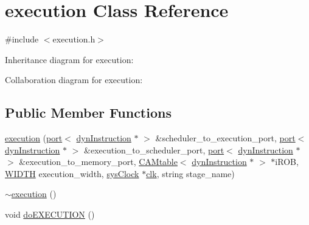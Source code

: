 \hypertarget{classexecution}{
\section{execution Class Reference}
\label{classexecution}
}


{\ttfamily \#include $<$execution.h$>$}



Inheritance diagram for execution:


Collaboration diagram for execution:
\subsection*{Public Member Functions}
\begin{DoxyCompactItemize}
\item 
\hyperlink{classexecution_a8f150cc5dfd7174f3bdfd168a083c0e7}{execution} (\hyperlink{classport}{port}$<$ \hyperlink{classdynInstruction}{dynInstruction} $\ast$ $>$ \&scheduler\_\-to\_\-execution\_\-port, \hyperlink{classport}{port}$<$ \hyperlink{classdynInstruction}{dynInstruction} $\ast$ $>$ \&execution\_\-to\_\-scheduler\_\-port, \hyperlink{classport}{port}$<$ \hyperlink{classdynInstruction}{dynInstruction} $\ast$ $>$ \&execution\_\-to\_\-memory\_\-port, \hyperlink{classCAMtable}{CAMtable}$<$ \hyperlink{classdynInstruction}{dynInstruction} $\ast$ $>$ $\ast$iROB, \hyperlink{global_2global_8h_a6fa2e24b8a418fa215e183264cbea3aa}{WIDTH} execution\_\-width, \hyperlink{classsysClock}{sysClock} $\ast$\hyperlink{g__objs_8h_afc4784c140eed1743728e83840e91c12}{clk}, string stage\_\-name)
\item 
\hyperlink{classexecution_a686c28582542ecb0a4d41f9a649a6357}{$\sim$execution} ()
\item 
void \hyperlink{classexecution_a7f0afb47a246180e50733c258ae35b0a}{doEXECUTION} ()
\end{DoxyCompactItemize}


